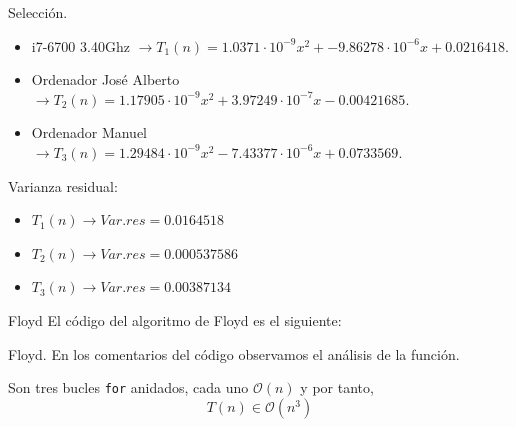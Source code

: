 \documentclass[10pt, xcolor=table]{beamer}
\begin{document}
\begin{frame}[fragile]{Selección.
		}
	\begin{itemize}
		\item i7-6700 3.40Ghz \(\rightarrow T_1(n) = 1.0371 \cdot 10^{-9} x^2 + -9.86278 \cdot 10^{-6} x +0.0216418\).
		\item Ordenador José Alberto \(\rightarrow T_2(n) = 1.17905 \cdot 10^{-9} x^2 + 3.97249 \cdot 10^{-7} x - 0.00421685\).
		\item Ordenador Manuel \(\rightarrow T_3(n) = 1.29484 \cdot 10^{-9} x^2 - 7.43377 \cdot 10^{-6} x + 0.0733569\).
	\end{itemize}
	
	Varianza residual:
	\begin{itemize}
		\item \(T_1(n) \longrightarrow Var.res = 0.0164518\)
		\item \(T_2(n) \longrightarrow Var.res = 0.000537586\)
		\item \(T_3(n) \longrightarrow Var.res = 0.00387134\)
	\end{itemize}
\end{frame}

\begin{frame}{Floyd}
El código del algoritmo de Floyd es el siguiente:

\end{frame}

\begin{frame}[fragile]{Floyd.
}
En los comentarios del código observamos el análisis de la función.

Son tres bucles \texttt{for} anidados, cada uno \(\mathcal{O}(n)\) y por tanto,
\[
	T(n) \in \mathcal{O}(n^3)
\]
\end{frame}
\end{document}
